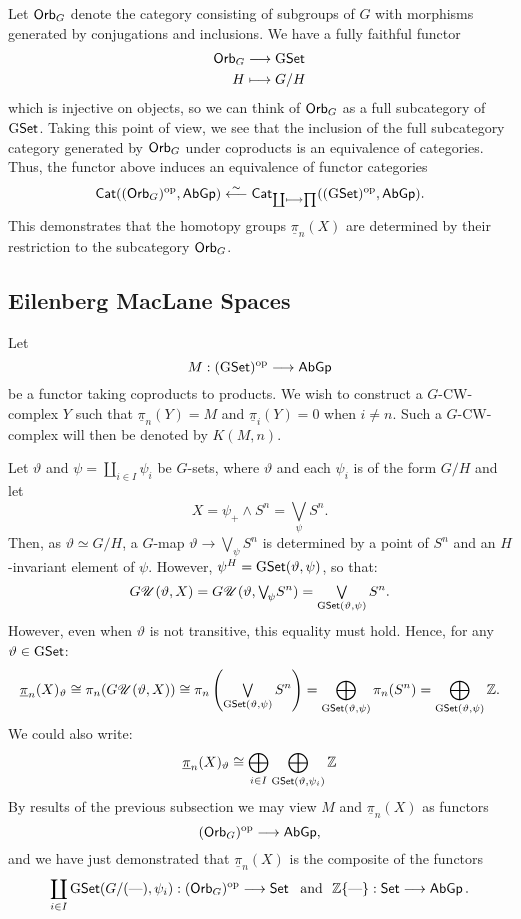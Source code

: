 \documentclass[11pt]{article}
\newcommand{\rednote}[1]{{\color{red}#1}\scalebox{.1}{rednote}}
\newcommand{\funcdef}[4]{\begin{align*}
#1&\to #2\\
#3&\mapsto#4
\end{align*}}
\begin{document}
Let $\operatorname{{\mathsf{Orb}}}_G$ denote the category consisting of subgroups of $G$ with morphisms generated by conjugations and inclusions. We have a fully faithful functor
\funcdef{\Orb_G}{\GSet}{H}{G/H}
which is injective on objects, so we can think of $\operatorname{{\mathsf{Orb}}}_G$ as a full subcategory of $\operatorname{{G\mathsf{Set}}}$. Taking this point of view, we see that the inclusion of the full subcategory category generated by $\operatorname{{\mathsf{Orb}}}_G$ under coproducts is an equivalence of categories. Thus, the functor above induces an equivalence of functor categories
\[\Cat((\Orb_G)^{\textup{op}},\AbGp)\overset{\sim}{\longleftarrow}\Cat_{\coprod\shortmapsto\prod}((\GSet)^{\textup{op}},\AbGp).\]
This demonstrates that the homotopy groups $\underline{\pi}_n(X)$ are determined by their restriction to the subcategory $\operatorname{{\mathsf{Orb}}}_G$.

\subsection*{Eilenberg MacLane Spaces}
Let
\[M:(\operatorname{{G\mathsf{Set}}})^{\textup{op}}\longrightarrow\operatorname{{\mathsf{AbGp}}}\]
be a functor taking coproducts to products. We wish to construct a $G$-CW-complex $Y$ such that $\underline{\pi}_n(Y)=M$ and $\underline{\pi}_i(Y)=0$ when $i\neq n$. Such a $G$-CW-complex will then be denoted by $K(M,n)$.

Let $\vartheta$ and $\psi=\coprod_{i\in I}\psi_i$ be $G$-sets, where $\vartheta$ and each $\psi_i$ is of the form $G/H$ and let
\[X=\psi_+\wedge S^n={\textstyle\bigvee_{\!\psi}} S^n.\]
Then, as $\vartheta\simeq G/H$, a $G$-map $\vartheta\to \bigvee_{\!\psi} S^n$ is determined by a point of $S^n$ and an $H$-invariant element of $\psi$. However, $\psi^H=\operatorname{{G\mathsf{Set}}}(\vartheta,\psi)$, so that:
\[G\mathscr{U}(\vartheta,X)=G\mathscr{U}(\vartheta,{\textstyle\bigvee_{\!\psi}} S^n)=\mathop{\textstyle{\bigvee}}_{\operatorname{{G\mathsf{Set}}}(\vartheta,\psi)} S^n.\]
However, even when $\vartheta$ is not transitive, this equality must hold. Hence, for any $\vartheta\in \operatorname{{G\mathsf{Set}}}$:
\[\underline{\pi}_n(X)_{\vartheta}\cong\pi_n(G\mathscr{U}(\vartheta,X))
\cong\pi_n\left(\mathop{\textstyle{\bigvee}}_{\operatorname{{G\mathsf{Set}}}(\vartheta,\psi)} S^n\right)= \bigoplus_{\operatorname{{G\mathsf{Set}}}(\vartheta,\psi)}\pi_n(S^n)=
\bigoplus_{\operatorname{{G\mathsf{Set}}}(\vartheta,\psi)}\mathbb{Z}.\]
We could also write: %
\[\underline{\pi}_n(X)_{\vartheta}\cong\bigoplus_{i\in I}\bigoplus_{\operatorname{{G\mathsf{Set}}}(\vartheta,\psi_i)}\mathbb{Z}\]
By results of the previous subsection we may view $M$ and $\underline{\pi}_n(X)$ as functors
\[(\operatorname{{\mathsf{Orb}}}_G)^{\textup{op}}\longrightarrow\operatorname{{\mathsf{AbGp}}},\]
and we have just demonstrated that $\underline{\pi}_n(X)$ is the composite of the functors
\[\coprod_{i\in I}\GSet(G/(\DASH),\psi_i):(\Orb_G)^{\textup{op}}\to\Set\text{ \ and \ }\mathbb{Z}\{\DASH\}:\Set\to\AbGp.\]
\end{document}
